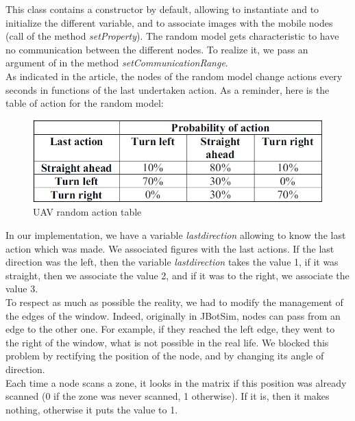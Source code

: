 This class contains a constructor by default, allowing to instantiate and to initialize the different variable, and to associate images with the mobile nodes (call of the method \textit{setProperty}). The random model gets characteristic to have no communication between the different nodes. To realize it, we pass an argument of  in the method \textit{setCommunicationRange}.\\

As indicated in the article, the nodes of the random model change actions every seconds in functions of the last undertaken action. As a reminder, here is the table of action for the random model:\\

\begin{figure}[h]
\center
\includegraphics[width=15cm]{../images/table_random.png}
\caption{UAV random action table\cite{UAV}}
\end{figure}

In our implementation, we have a variable \textit{lastdirection} allowing to know the last action which was made. We associated figures with the last actions. If the last direction was the left, then the variable \textit {lastdirection} takes the value 1, if it was straight, then we associate the value 2, and if it was to the right, we associate the value 3.\\

To respect as much as possible the reality, we had to modify the management of the edges of the window. Indeed, originally in JBotSim, nodes can pass from an edge to the other one. For example, if they reached the left edge, they went to the right of the window, what is not possible in the real life. We blocked this problem by rectifying the position of the node, and by changing its angle of direction.\\

Each time a node scans a zone, it looks in the matrix if this position was already scanned (0 if the zone was never scanned, 1 otherwise). If it is, then it makes nothing, otherwise it puts the value to 1.\\

